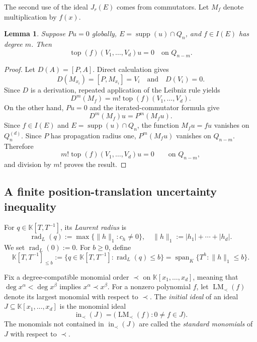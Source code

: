 \documentclass[11pt,reqno]{amsart}
\newcommand\K{\ensuremath{\mathbb{K}}}
\newcommand{\supp}{\operatorname{supp}}
\newtheorem{lemma}[theorem]{Lemma}
\theoremstyle{definition}
\theoremstyle{plain}
\numberwithin{equation}{section}
\begin{document}
The second use of the ideal $J_r(E)$ comes from commutators.  Let $M_f$
denote multiplication by $f(x)$.

\begin{lemma}\label{lem:commutator}
Suppose $Pu=0$ globally, $E=\supp(u)\cap Q_n$, and
$f\in I(E)$ has degree $m$.  Then
\begin{equation*}
        \operatorname{top}(f)(V_1,\ldots,V_d)u=0
        \quad\text{on }Q_{n-m}.
\end{equation*}
\end{lemma}

\begin{proof}
Let $D(A)=[P,A]$. Direct calculation gives
\[
    D(M_{x_i})=[P,M_{x_i}]=V_i
    \quad \text{and}\quad
    D(V_i)=0.
\]
Since $D$ is a derivation, repeated application of the Leibniz rule yields
\[
    D^m(M_f)=m!\operatorname{top}(f)(V_1,\ldots,V_d).
\]
On the other hand, $Pu=0$ and the iterated-commutator formula give
\[
    D^m(M_f)u=P^m(M_fu).
\]
Since $f\in I(E)$ and $E=\operatorname{supp}(u)\cap Q_n$, the function
$M_fu=fu$ vanishes on $Q_n^{(d)}$. Since $P$ has propagation radius one,
$P^m(M_fu)$ vanishes on $Q_{n-m}$. Therefore
\[
    m!\operatorname{top}(f)(V_1,\ldots,V_d)u=0
    \qquad\text{on }Q_{n-m},
\]
and division by $m!$ proves the result.
\end{proof}

\subsection{A finite position-translation uncertainty inequality}


For $q\in \K[T,T^{-1}]$, its \emph{Laurent radius} is
\[
    \operatorname{rad}_{L}(q)
    :=
    \max\bigl\{
        \lVert h\rVert_1:c_h\neq0
    \bigr\},
    \quad
    \lVert h\rVert_1
    :=
    |h_1|+\cdots+|h_d|.
\]
We set $\operatorname{rad}_{L}(0):=0$. For $b\geq0$, define
\[
    \K[T,T^{-1}]_{\leq b}
    :=
    \bigl\{
        q\in \K[T,T^{-1}]:
        \operatorname{rad}_{L}(q)\leq b
    \bigr\}=
    \operatorname{span}_K
    \bigl\{
        T^h:\lVert h\rVert_1\leq b
    \bigr\}.
\]


Fix a degree-compatible monomial order $\prec$ on
$\mathbb{K}[x_1,\ldots,x_d]$, meaning that
$\deg x^\alpha<\deg x^\beta$ implies $x^\alpha\prec x^\beta$.
For a nonzero polynomial $f$, let $\operatorname{LM}_\prec(f)$ denote
its largest monomial with respect to $\prec$. The \emph{initial ideal} of an
ideal $J\subseteq\mathbb{K}[x_1,\ldots,x_d]$ is the monomial ideal
\[
\operatorname{in}_\prec(J)
=
\bigl(\operatorname{LM}_\prec(f):0\neq f\in J\bigr).
\]
The monomials not contained in $\operatorname{in}_\prec(J)$ are called
the \emph{standard monomials} of $J$ with respect to $\prec$.
\end{document}
